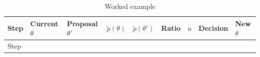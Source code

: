 \begin{landscape}\small
\begin{longtable}[]{@{}
  >{\raggedright\arraybackslash}p{}
  >{\raggedright\arraybackslash}p{}
  >{\raggedright\arraybackslash}p{}
  >{\raggedright\arraybackslash}p{}
  >{\raggedright\arraybackslash}p{}
  >{\raggedright\arraybackslash}p{}
  >{\raggedright\arraybackslash}p{}
  >{\raggedright\arraybackslash}p{}
  >{\raggedright\arraybackslash}p{}@{}}
\caption{\centering Worked example}\tabularnewline
\toprule\noalign{}
\begin{minipage}[b]{\linewidth}\raggedright
Step
\end{minipage} & \begin{minipage}[b]{\linewidth}\raggedright
Current \(\theta\)
\end{minipage} & \begin{minipage}[b]{\linewidth}\raggedright
Proposal \(\theta'\)
\end{minipage} & \begin{minipage}[b]{\linewidth}\raggedright
\(\tilde p(\theta)\)
\end{minipage} & \begin{minipage}[b]{\linewidth}\raggedright
\(\tilde p(\theta')\)
\end{minipage} & \begin{minipage}[b]{\linewidth}\raggedright
Ratio
\end{minipage} & \begin{minipage}[b]{\linewidth}\raggedright
\(u\)
\end{minipage} & \begin{minipage}[b]{\linewidth}\raggedright
Decision
\end{minipage} & \begin{minipage}[b]{\linewidth}\raggedright
New \(\theta\)
\end{minipage} \\
\midrule\noalign{}
\endfirsthead
\toprule\noalign{}
\begin{minipage}[b]{\linewidth}\raggedright
Step
\end{minipage} & \begin{minipage}[b]{\linewidth}\raggedright

\end{minipage}
\end{longtable}
\end{landscape}
